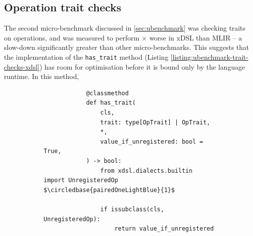 \subsection{Operation trait checks}
\label{ssec:specialising-ubenchmarks-trait}

The second micro-benchmark discussed in \autoref{sec:ubenchmark} was checking traits on operations, and was measured to perform $\times$ worse in xDSL than MLIR -- a slow-down significantly greater than other micro-benchmarks.
This suggests that the implementation of the \texttt{has_trait} method (Listing \ref{listing:ubenchmark-trait-checks-xdsl}) has room for optimisation before it is bound only by the language runtime.
In this method,

\begin{figure}[H]
    \begin{subfigure}[b]{0.45\textwidth}
       \centering
        \begin{verbatim}
            @classmethod
            def has_trait(
                cls,
                trait: type[OpTrait] | OpTrait,
                *,
                value_if_unregistered: bool = True,
            ) -> bool:
                from xdsl.dialects.builtin import UnregisteredOp $\circledbase{pairedOneLightBlue}{1}$

                if issubclass(cls, UnregisteredOp):
                    return value_if_unregistered


\end{verbatim}
\end{subfigure}
\end{figure}
